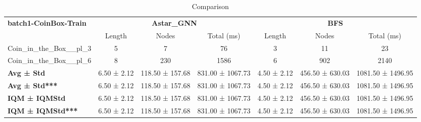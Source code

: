 \begin{table}[!ht]
\centering
\small
\begin{tabular}{l|ccc|ccc}
\multirow{2}{*}{\textbf{batch1-CoinBox-Train}} & \multicolumn{3}{c|}{\textbf{Astar\_GNN}} & \multicolumn{3}{c}{\textbf{BFS}} \\
\cline{2-7}
& Length & Nodes & Total (ms) & Length & Nodes & Total (ms) \\
\hline
Coin\_in\_the\_Box\_\_pl\_3 & 5 & 7 & 76 & 3 & 11 & 23 \\
Coin\_in\_the\_Box\_\_pl\_6 & 8 & 230 & 1586 & 6 & 902 & 2140 \\
\hline
\textbf{Avg ± Std} & 6.50 ± 2.12 & 118.50 ± 157.68 & 831.00 ± 1067.73 & 4.50 ± 2.12 & 456.50 ± 630.03 & 1081.50 ± 1496.95 \\
\textbf{Avg ± Std***} & 6.50 ± 2.12 & 118.50 ± 157.68 & 831.00 ± 1067.73 & 4.50 ± 2.12 & 456.50 ± 630.03 & 1081.50 ± 1496.95 \\
\textbf{IQM ± IQMStd} & 6.50 ± 2.12 & 118.50 ± 157.68 & 831.00 ± 1067.73 & 4.50 ± 2.12 & 456.50 ± 630.03 & 1081.50 ± 1496.95 \\
\textbf{IQM ± IQMStd***} & 6.50 ± 2.12 & 118.50 ± 157.68 & 831.00 ± 1067.73 & 4.50 ± 2.12 & 456.50 ± 630.03 & 1081.50 ± 1496.95 \\
\end{tabular}
\caption{Comparison}
\label{tab:batch1_CoinBox_comparison_train}
\end{table}
